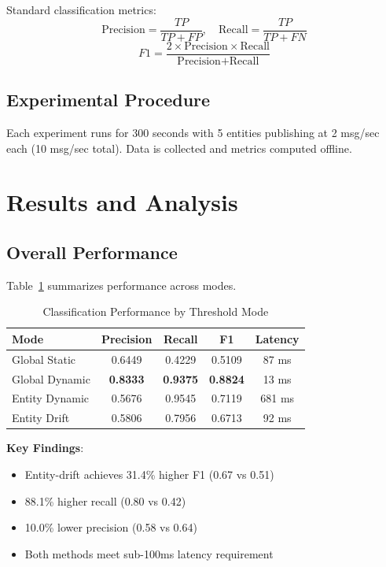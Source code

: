 \documentclass[conference]{IEEEtran}
\begin{document}
Standard classification metrics:
\begin{equation}
\text{Precision} = \frac{TP}{TP + FP}, \quad \text{Recall} = \frac{TP}{TP + FN}
\end{equation}
\begin{equation}
F1 = \frac{2 \times \text{Precision} \times \text{Recall}}{\text{Precision} + \text{Recall}}
\end{equation}

\subsection{Experimental Procedure}

Each experiment runs for 300 seconds with 5 entities publishing at 2 msg/sec each (10 msg/sec total). Data is collected and metrics computed offline.

\section{Results and Analysis}

\subsection{Overall Performance}

Table~\ref{tab:overall} summarizes performance across modes.

\begin{table}[htbp]
\caption{Classification Performance by Threshold Mode}
\begin{center}
\begin{tabular}{lcccc}
\toprule
\textbf{Mode} & \textbf{Precision} & \textbf{Recall} & \textbf{F1} & \textbf{Latency} \\
\midrule
Global Static & 0.6449 & 0.4229 & 0.5109 & 87 ms \\
Global Dynamic & \textbf{0.8333} & \textbf{0.9375} & \textbf{0.8824} & 13 ms \\
Entity Dynamic & 0.5676 & 0.9545 & 0.7119 & 681 ms \\
Entity Drift & 0.5806 & 0.7956 & 0.6713 & 92 ms \\
\bottomrule
\end{tabular}
\label{tab:overall}
\end{center}
\end{table}

\textbf{Key Findings}:
\begin{itemize}
\item Entity-drift achieves 31.4\% higher F1 (0.67 vs 0.51)
\item 88.1\% higher recall (0.80 vs 0.42)
\item 10.0\% lower precision (0.58 vs 0.64)
\item Both methods meet sub-100ms latency requirement
\end{itemize}
\end{document}
